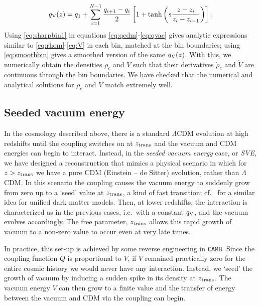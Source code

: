 \documentclass[a4paper,fleqn,usenatbib]{mnras}
\newcommand*{\qv}{$q_{\rm V}(z)$}
\begin{document}
\begin{equation}\label{eq:smoothbin}
q_{\rm V}(z)=q_1+\sum_{i=1}^{N-1}\frac{q_{i+1}-q_{i}}{2}\left[1+\tanh{\left(s\frac{z-z_i}{z_i-z_{i-1}}\right)}\right].
\end{equation}
Using \eqref{eq:sharpbin1} in equations \eqref{eq:qcdm}-\eqref{eq:qvac} gives analytic expressions similar to \eqref{eq:rhom}-\eqref{eq:V} in each bin, matched at the bin boundaries; using \eqref{eq:smoothbin} gives a smoothed version of the same \qv. With this, we numerically obtain the densities $\rho_c$ and $V$ such that their derivatives $\dot{\rho}_c$ and $\dot{V}$ are continuous through the bin boundaries. We have checked that the numerical and analytical solutions for $\rho_c$ and $V$ match extremely well.

\subsection{Seeded vacuum energy}
In the cosmology described above, there is a standard $\Lambda$CDM evolution at high redshifts until the coupling switches on at $z_{\rm trans}$ and the vacuum and CDM energies can begin to interact. Instead, in the \textit{seeded vacuum energy} case, or \textit{SVE}, we have designed a reconstruction that mimics a physical scenario in which for $z >z_{\rm trans}$ we have a pure CDM (Einstein -- de Sitter) evolution, rather than  $\Lambda$CDM. In this scenario the coupling causes the vacuum energy to suddenly grow from zero up to a  `seed' value at $z_{\rm trans}$, a kind of fast transition; cf.\ \cite{Piattella:2009kt,Bertacca:2010mt} for a similar idea for unified dark matter models. Then, at lower redshifts, the interaction is characterized  as in the previous  cases, i.e.\ with a constant $q_{\rm V}$, and the vacuum evolves accordingly. The free parameter, $z_{\rm trans}$ allows this rapid growth of vacuum to a non-zero value to occur even at very late times.

In practice, this set-up is achieved by some reverse engineering in \texttt{CAMB}. Since the coupling function $Q$ is proportional to $V$, if $V$ remained practically zero for the entire cosmic history we would never have any interaction. Instead, we `seed' the growth of vacuum by inducing a sudden spike in its density at $z_{\rm trans}$. The vacuum energy $V$ can then grow to a finite value and the transfer of energy between the vacuum and CDM via the coupling can begin.
\end{document}
